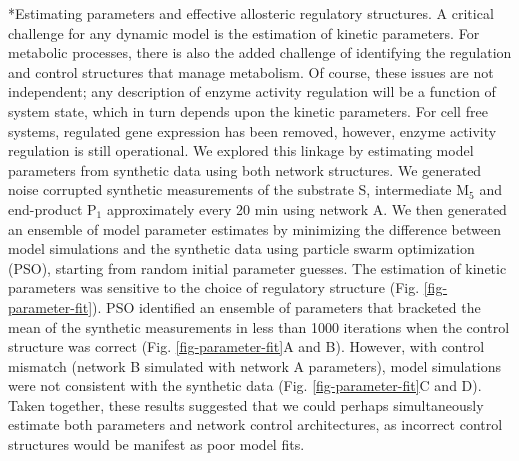 \documentclass[12pt]{article}
\makeatletter
\renewcommand\subsection{\@startsection
	{subsection}{2}{0mm}
	{-0.05in}
	{-0.5\baselineskip}
	{\normalfont\normalsize\bfseries}}
\makeatother
\begin{document}
\subsection*{Estimating parameters and effective allosteric regulatory structures.}
A critical challenge for any dynamic model is the estimation of kinetic parameters. 
For metabolic processes, there is also the added challenge of identifying the regulation and control structures that manage metabolism.  
Of course, these issues are not independent; any description of enzyme activity regulation will be a function of system state, which
in turn depends upon the kinetic parameters. For cell free systems, regulated gene expression has been removed, however, enzyme activity regulation is still operational. 
We explored this linkage by estimating model parameters from synthetic data using both network
structures. We generated noise corrupted synthetic measurements of the substrate S, intermediate M$_{5}$ and end-product P$_1$ approximately every 20 min using
network A. We then generated an ensemble of model parameter estimates by minimizing the difference between model simulations and the synthetic data using particle swarm
optimization (PSO), starting from random initial parameter guesses. The estimation of kinetic parameters was sensitive to the choice of regulatory structure (Fig. \ref{fig-parameter-fit}).
PSO identified an ensemble of parameters that bracketed the mean of the synthetic measurements in less than 1000 iterations 
when the control structure was correct (Fig. \ref{fig-parameter-fit}A and B).
However, with control mismatch (network B simulated with network A parameters), model simulations were not consistent with the synthetic data  (Fig. \ref{fig-parameter-fit}C and D). 
Taken together, these results suggested that we could perhaps simultaneously estimate both parameters and network control architectures, as incorrect control structures 
would be manifest as poor model fits.
\end{document}
